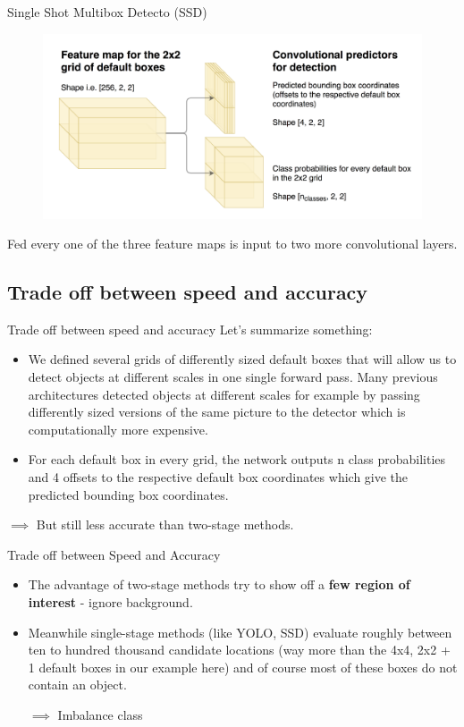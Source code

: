 \documentclass[aspectratio=169]{beamer}
\begin{document}
\begin{frame}{Single Shot Multibox Detecto (SSD)}
\begin{figure}
    \centering
    \includegraphics[scale=.35]{demo/figs/ssd5.png}
\end{figure}
Fed every one of the three feature maps is input to two more convolutional layers.
\end{frame}

\subsection{Trade off between speed and accuracy}
\begin{frame}{Trade off between speed and accuracy}
Let's summarize something:
\begin{itemize}
    \item We defined several grids of differently sized default boxes that will allow us to detect objects at different scales in one single forward pass. Many previous architectures detected objects at different scales for example by passing differently sized versions of the same picture to the detector which is computationally more expensive.
    \item For each default box in every grid, the network outputs n class probabilities and 4 offsets to the respective default box coordinates which give the predicted bounding box coordinates.
\end{itemize}
$\implies$ But still less accurate than two-stage methods.
\end{frame}

\begin{frame}{Trade off between Speed and Accuracy}
\begin{itemize}
    \item The advantage of two-stage methods try to show off a \textbf{few region of interest} - ignore background.
    \item Meanwhile single-stage methods (like YOLO, SSD) evaluate roughly between ten to hundred thousand candidate locations (way more than the 4x4, 2x2 + 1 default boxes in our example here) and of course most of these boxes do not contain an object.
    
    $\implies$ Imbalance class
\end{itemize}
\end{frame}
\end{document}

